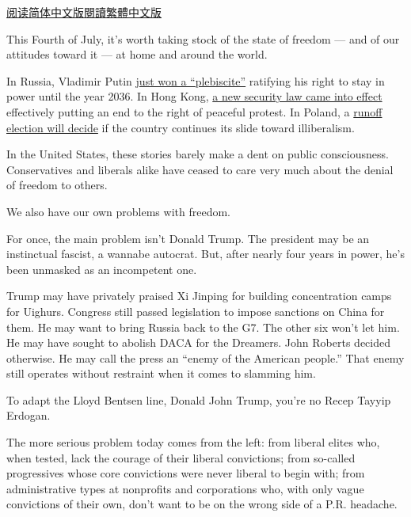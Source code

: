 \href{https://cn.nytimes3xbfgragh.onion/opinion/20200706/orwell-fourth-of-july/}{阅读简体中文版}\href{https://cn.nytimes3xbfgragh.onion/opinion/20200706/orwell-fourth-of-july/zh-hant/}{閱讀繁體中文版}

This Fourth of July, it's worth taking stock of the state of freedom ---
and of our attitudes toward it --- at home and around the world.

In Russia, Vladimir Putin
\href{https://www.nytimes3xbfgragh.onion/2020/07/01/world/europe/putin-referendum-vote-russia.html?action=click\&module=Top\%20Stories\&pgtype=Homepage}{just
won a ``plebiscite''} ratifying his right to stay in power until the
year 2036. In Hong Kong,
\href{https://www.nytimes3xbfgragh.onion/2020/07/01/world/asia/hong-kong-security-law-china.html}{a
new security law came into effect} effectively putting an end to the
right of peaceful protest. In Poland, a
\href{https://foreignpolicy.com/2020/05/04/poland-is-showing-the-world-how-not-to-run-a-pandemic-election/}{runoff
election will decide} if the country continues its slide toward
illiberalism.

In the United States, these stories barely make a dent on public
consciousness. Conservatives and liberals alike have ceased to care very
much about the denial of freedom to others.

We also have our own problems with freedom.

For once, the main problem isn't Donald Trump. The president may be an
instinctual fascist, a wannabe autocrat. But, after nearly four years in
power, he's been unmasked as an incompetent one.

Trump may have privately praised Xi Jinping for building concentration
camps for Uighurs. Congress still passed legislation to impose sanctions
on China for them. He may want to bring Russia back to the G7. The other
six won't let him. He may have sought to abolish DACA for the Dreamers.
John Roberts decided otherwise. He may call the press an ``enemy of the
American people.'' That enemy still operates without restraint when it
comes to slamming him.

To adapt the Lloyd Bentsen line, Donald John Trump, you're no Recep
Tayyip Erdogan.

The more serious problem today comes from the left: from liberal elites
who, when tested, lack the courage of their liberal convictions; from
so-called progressives whose core convictions were never liberal to
begin with; from administrative types at nonprofits and corporations
who, with only vague convictions of their own, don't want to be on the
wrong side of a P.R. headache.

